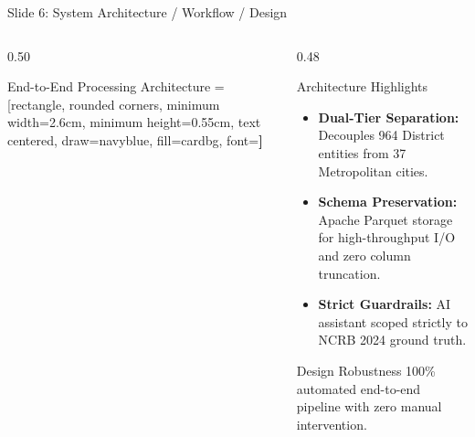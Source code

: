 \documentclass[aspectratio=169,10pt]{beamer}
\begin{document}
\begin{frame}{Slide 6: System Architecture / Workflow / Design}
    \begin{columns}[T]
        \begin{column}{0.50\textwidth}
            \begin{block}{End-to-End Processing Architecture}
                \centering
                 = [rectangle, rounded corners, minimum width=2.6cm, minimum height=0.55cm, text centered, draw=navyblue, fill=cardbg, font=\tiny\bfseries]
            \end{block}
        \end{column}
        \begin{column}{0.48\textwidth}
            \begin{block}{Architecture Highlights}
                \footnotesize
                \begin{itemize}
                    \item \textbf{Dual-Tier Separation:} Decouples 964 District entities from 37 Metropolitan cities.
                    \item \textbf{Schema Preservation:} Apache Parquet storage for high-throughput I/O and zero column truncation.
                    \item \textbf{Strict Guardrails:} AI assistant scoped strictly to NCRB 2024 ground truth.
                \end{itemize}
            \end{block}
            \begin{alertblock}{Design Robustness}
                \footnotesize
                100\% automated end-to-end pipeline with zero manual intervention.
            \end{alertblock}
        \end{column}
    \end{columns}
\end{frame}
\end{document}
